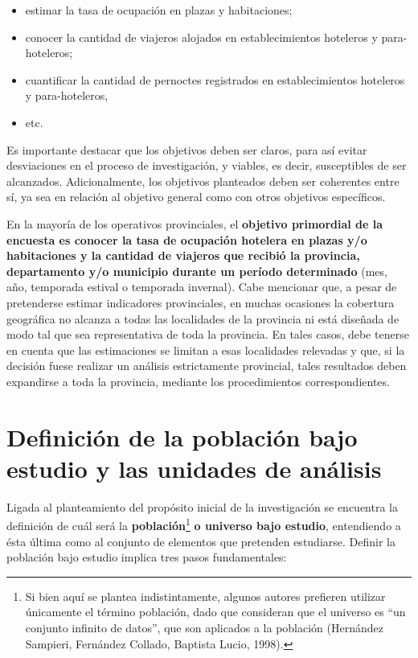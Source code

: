 \documentclass[
]{book}
\begin{document}
\begin{itemize}
\item
  estimar la tasa de ocupación en plazas y habitaciones;
\item
  conocer la cantidad de viajeros alojados en establecimientos hoteleros y para-hoteleros;
\item
  cuantificar la cantidad de pernoctes registrados en establecimientos hoteleros y para-hoteleros,
\item
  etc.
\end{itemize}

Es importante destacar que los objetivos deben ser claros, para así evitar desviaciones en el proceso de investigación, y viables, es decir, susceptibles de ser alcanzados. Adicionalmente, los objetivos planteados deben ser coherentes entre sí, ya sea en relación al objetivo general como con otros objetivos específicos.

En la mayoría de los operativos provinciales, el \textbf{objetivo primordial de la encuesta es conocer la tasa de ocupación hotelera en plazas y/o habitaciones y la cantidad de viajeros que recibió la provincia, departamento y/o municipio durante un período determinado} (mes, año, temporada estival o temporada invernal). Cabe mencionar que, a pesar de pretenderse estimar indicadores provinciales, en muchas ocasiones la cobertura geográfica no alcanza a todas las localidades de la provincia ni está diseñada de modo tal que sea representativa de toda la provincia. En tales casos, debe tenerse en cuenta que las estimaciones se limitan a esas localidades relevadas y que, si la decisión fuese realizar un análisis estrictamente provincial, tales resultados deben expandirse a toda la provincia, mediante los procedimientos correspondientes.

\hypertarget{definiciuxf3n-de-la-poblaciuxf3n-bajo-estudio-y-las-unidades-de-anuxe1lisis}{%
\section{Definición de la población bajo estudio y las unidades de análisis}\label{definiciuxf3n-de-la-poblaciuxf3n-bajo-estudio-y-las-unidades-de-anuxe1lisis}}

Ligada al planteamiento del propósito inicial de la investigación se encuentra la definición de cuál será la \textbf{población}\footnote{Si bien aquí se plantea indistintamente, algunos autores prefieren utilizar únicamente el término población, dado que consideran que el universo es ``un conjunto infinito de datos'', que son aplicados a la población (Hernández Sampieri, Fernández Collado, Baptista Lucio, 1998).} \textbf{o universo bajo estudio}, entendiendo a ésta última como al conjunto de elementos que pretenden estudiarse. Definir la población bajo estudio implica tres pasos fundamentales:
\end{document}
